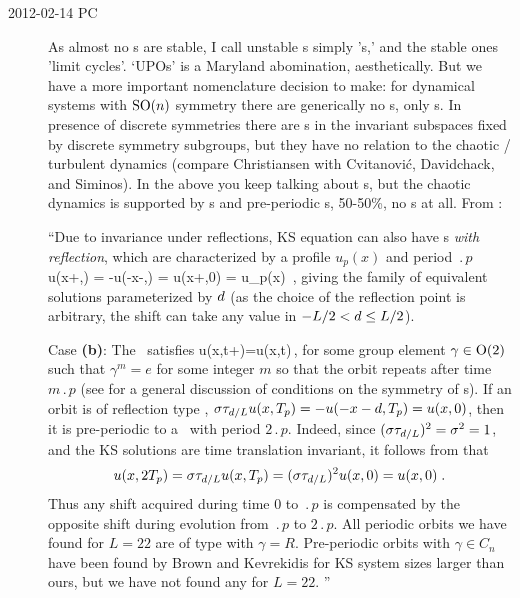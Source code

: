 \begin{description}
\item[2012-02-14 PC]                        \toCB
  As almost no \po s are stable, I call unstable \po s simply '\po s,' and
  the stable ones 'limit cycles'. `UPOs' is a Maryland abomination,
  aesthetically. But we have a more important nomenclature decision to
  make: for dynamical systems with $\textrm{SO}(n)$ symmetry there are generically
  no \po s, only \rpo s. In presence of discrete symmetries there are \po s
  in the invariant subspaces fixed by discrete symmetry subgroups, but they
  have no relation to the chaotic / turbulent dynamics (compare
  Christiansen with Cvitanovi{\'c}, Davidchack, and
  Siminos). In the above you keep talking about \po s, but the
  chaotic dynamics is supported by \rpo s and pre-periodic \rpo s, 50-50\%,
  no \po s at all. From :

  ``Due to invariance under reflections, KS equation can also have
  \rpo s {\em with reflection}, which are
  characterized by a profile $u_p(x)$ and
  period $\period{p}$
  \beq
  \Refl u(x+\shift,) =
  -u(-x-\shift,) = u(x+\shift,0) = u_p(x)
  \,,
  \label{KSpos}
  \eeq
  giving the family of equivalent solutions
  parameterized by $d$
  (as the choice of the reflection point is arbitrary,
  the shift can take any value in $-L/2 < d \leq L/2$).

  Case {\bf (b)}: The \po\ satisfies
  \beq
  u(x,t+)=\gamma u(x,t)\,,
  \label{eq:POspattemp}
  \eeq
  for some group element $\gamma\in \textrm{O}(2)$ such that $\gamma^m=e$ for some
  integer $m$ so that the orbit repeats after time $m \period{p}$ (see
   for a general discussion of conditions on the
  symmetry of \po s). If an orbit is of reflection type ,
  $\sigma\tau_{d/L} u(x,{T_{p}}) = -u(-x-d,{T_{p}}) =
  u(x,0)$, then it is pre-periodic to a \po\ with period $2\period{p}$.
  Indeed, since $(\sigma\tau_{d/L})^2 = \sigma^2 = 1$, and the KS
  solutions are time translation invariant, it follows from 
  that
  \[
    u(x,2{T_{p}}) = \sigma\tau_{d/L} u(x,{T_{p}}) =
    (\sigma\tau_{d/L})^2 u(x,0) = u(x,0)\;.
  \]
  Thus any shift acquired during time $0$ to $\period{p}$ is compensated by
  the opposite shift during evolution from $\period{p}$ to $2 \period{p}$.
  All periodic orbits we have found for $L=22$ are of type
   with $\gamma=R$. Pre-periodic orbits with
  $\gamma\in C_n$ have been found by Brown and Kevrekidis for
  KS system sizes larger than ours, but we have not found any for $L=22$.
  ''


\end{description}
